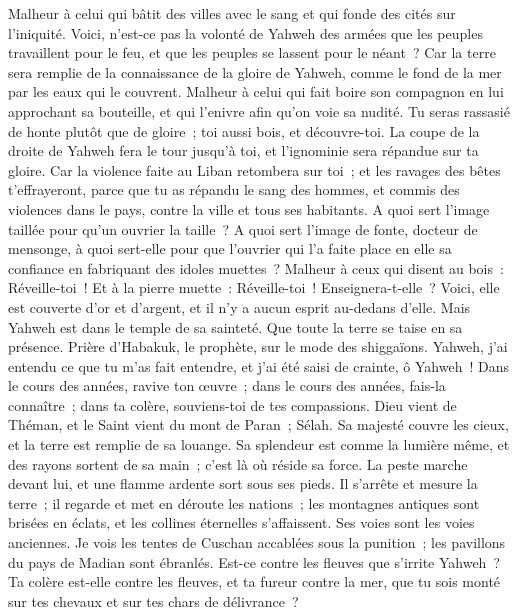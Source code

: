 \begin{multicols}{2}
Malheur à celui qui bâtit des villes avec le sang et qui fonde des cités sur l'iniquité.
Voici, n'est-ce pas la volonté de Yahweh des armées que les peuples travaillent pour le feu, et que les peuples se lassent pour le néant~?
Car la terre sera remplie de la connaissance de la gloire de Yahweh, comme le fond de la mer par les eaux qui le couvrent.
Malheur à celui qui fait boire son compagnon en lui approchant sa bouteille, et qui l'enivre afin qu'on voie sa nudité.
Tu seras rassasié de honte plutôt que de gloire~; toi aussi bois, et découvre-toi. La coupe de la droite de Yahweh fera le tour jusqu'à toi, et l'ignominie sera répandue sur ta gloire.
Car la violence faite au Liban retombera sur toi~; et les ravages des bêtes t'effrayeront, parce que tu as répandu le sang des hommes, et commis des violences dans le pays, contre la ville et tous ses habitants.
A quoi sert l'image taillée pour qu'un ouvrier la taille~? A quoi sert l'image de fonte, docteur de mensonge, à quoi sert-elle pour que l'ouvrier qui l'a faite place en elle sa confiance en fabriquant des idoles muettes~?
Malheur à ceux qui disent au bois~: Réveille-toi~! Et à la pierre muette~: Réveille-toi~! Enseignera-t-elle~? Voici, elle est couverte d'or et d'argent, et il n'y a aucun esprit au-dedans d'elle.
Mais Yahweh est dans le temple de sa sainteté. Que toute la terre se taise en sa présence.
\VerseOne{}Prière d'Habakuk, le prophète, sur le mode des shiggaïons.
Yahweh, j'ai entendu ce que tu m'as fait entendre, et j'ai été saisi de crainte, ô Yahweh~! Dans le cours des années, ravive ton œuvre~; dans le cours des années, fais-la connaître~; dans ta colère, souviens-toi de tes compassions.
Dieu vient de Théman, et le Saint vient du mont de Paran~; Sélah. Sa majesté couvre les cieux, et la terre est remplie de sa louange.
Sa splendeur est comme la lumière même, et des rayons sortent de sa main~; c'est là où réside sa force.
La peste marche devant lui, et une flamme ardente sort sous ses pieds.
Il s'arrête et mesure la terre~; il regarde et met en déroute les nations~; les montagnes antiques sont brisées en éclats, et les collines éternelles s'affaissent. Ses voies sont les voies anciennes.
Je vois les tentes de Cuschan accablées sous la punition~; les pavillons du pays de Madian sont ébranlés.
Est-ce contre les fleuves que s'irrite Yahweh~? Ta colère est-elle contre les fleuves, et ta fureur contre la mer, que tu sois monté sur tes chevaux et sur tes chars de délivrance~?

\end{multicols}
